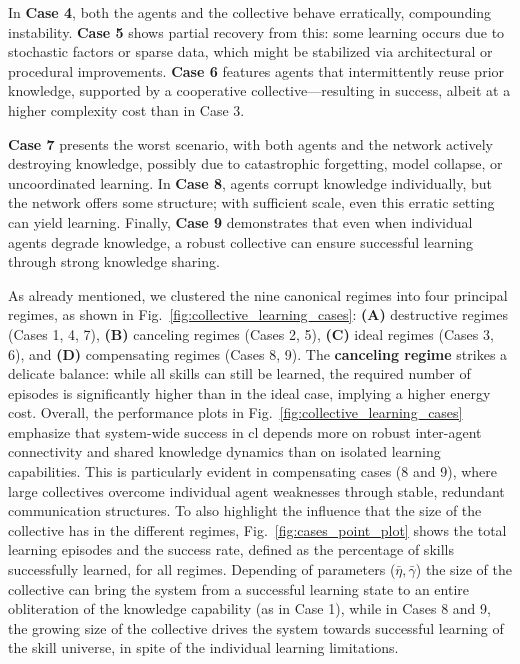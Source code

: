 \documentclass[12pt]{article}
\begin{document}
In \textbf{Case 4}, both the agents and the collective behave erratically, compounding instability. \textbf{Case 5} shows partial recovery from this: some learning occurs due to stochastic factors or sparse data, which might be stabilized via architectural or procedural improvements. \textbf{Case 6} features agents that intermittently reuse prior knowledge, supported by a cooperative collective—resulting in success, albeit at a higher complexity cost than in Case 3.

\textbf{Case 7} presents the worst scenario, with both agents and the network actively destroying knowledge, possibly due to catastrophic forgetting, model collapse, or uncoordinated learning. In \textbf{Case 8}, agents corrupt knowledge individually, but the network offers some structure; with sufficient scale, even this erratic setting can yield learning. Finally, \textbf{Case 9} demonstrates that even when individual agents degrade knowledge, a robust collective can ensure successful learning through strong knowledge sharing.

As already mentioned, we clustered the nine canonical regimes into four principal regimes, as shown in Fig.~\ref{fig:collective_learning_cases}: \textbf{(A)} destructive regimes (Cases 1, 4, 7), \textbf{(B)} canceling regimes (Cases 2, 5), \textbf{(C)} ideal regimes (Cases 3, 6), and \textbf{(D)} compensating regimes (Cases 8, 9). The \textbf{canceling regime} strikes a delicate balance: while all skills can still be learned, the required number of episodes is significantly higher than in the ideal case, implying a higher energy cost. Overall, the performance plots in Fig.~\ref{fig:collective_learning_cases} emphasize that system-wide success in \acl{cl} depends more on robust inter-agent connectivity and shared knowledge dynamics than on isolated learning capabilities. This is particularly evident in compensating cases (8 and 9), where large collectives overcome individual agent weaknesses through stable, redundant communication structures. To also highlight the influence that the size of the collective has in the different regimes, Fig.~\ref{fig:cases_point_plot} shows the total learning episodes and the success rate, defined as the percentage of skills successfully learned, for all regimes. Depending of parameters ($\bar{\eta},\bar{\gamma}$) the size of the collective can bring the system from a successful learning state to an entire obliteration of the knowledge capability (as in Case 1), while in Cases 8 and 9, the growing size of the collective drives the system towards successful learning of the skill universe, in spite of the individual learning limitations.
\end{document}
